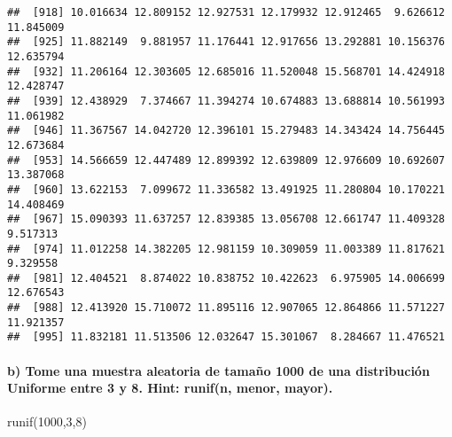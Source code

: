 \documentclass[
]{article}
\newenvironment{Shaded}{\begin{snugshade}}{\end{snugshade}}
\newcommand{\DecValTok}[1]{\textcolor[rgb]{0.00,0.00,0.81}{#1}}
\newcommand{\FunctionTok}[1]{\textcolor[rgb]{0.00,0.00,0.00}{#1}}
\newcommand{\NormalTok}[1]{#1}
\begin{document}
\begin{verbatim}
##  [918] 10.016634 12.809152 12.927531 12.179932 12.912465  9.626612 11.845009
##  [925] 11.882149  9.881957 11.176441 12.917656 13.292881 10.156376 12.635794
##  [932] 11.206164 12.303605 12.685016 11.520048 15.568701 14.424918 12.428747
##  [939] 12.438929  7.374667 11.394274 10.674883 13.688814 10.561993 11.061982
##  [946] 11.367567 14.042720 12.396101 15.279483 14.343424 14.756445 12.673684
##  [953] 14.566659 12.447489 12.899392 12.639809 12.976609 10.692607 13.387068
##  [960] 13.622153  7.099672 11.336582 13.491925 11.280804 10.170221 14.408469
##  [967] 15.090393 11.637257 12.839385 13.056708 12.661747 11.409328  9.517313
##  [974] 11.012258 14.382205 12.981159 10.309059 11.003389 11.817621  9.329558
##  [981] 12.404521  8.874022 10.838752 10.422623  6.975905 14.006699 12.676543
##  [988] 12.413920 15.710072 11.895116 12.907065 12.864866 11.571227 11.921357
##  [995] 11.832181 11.513506 12.032647 15.301067  8.284667 11.476521
\end{verbatim}

\hypertarget{b-tome-una-muestra-aleatoria-de-tamauxf1o-1000-de-una-distribuciuxf3n-uniforme-entre-3-y-8.-hint-runifn-menor-mayor.}{%
\paragraph{b) Tome una muestra aleatoria de tamaño 1000 de una
distribución Uniforme entre 3 y 8. Hint: runif(n, menor,
mayor).}\label{b-tome-una-muestra-aleatoria-de-tamauxf1o-1000-de-una-distribuciuxf3n-uniforme-entre-3-y-8.-hint-runifn-menor-mayor.}}

\begin{Shaded}
\begin{Highlighting}[]
\FunctionTok{runif}\NormalTok{(}\DecValTok{1000}\NormalTok{,}\DecValTok{3}\NormalTok{,}\DecValTok{8}\NormalTok{)}
\end{Highlighting}
\end{Shaded}
\end{document}
